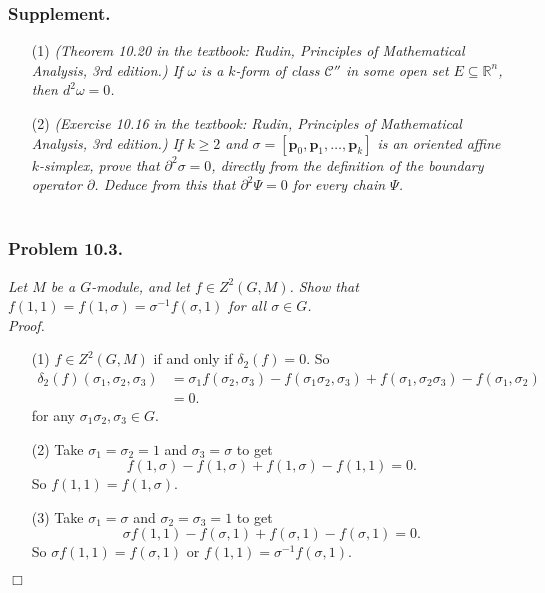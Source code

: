 \documentclass{article}
\begin{document}
\subsubsection*{Supplement.}
\begin{enumerate}
\item[(1)]
  \emph{(Theorem 10.20 in the textbook:
  Rudin, Principles of Mathematical Analysis, 3rd edition.)
  If $\omega$ is a $k$-form of class $\mathscr{C}''$
  in some open set $E \subseteq \mathbb{R}^n$, then $d^2 \omega = 0$.}

\item[(2)]
  \emph{(Exercise 10.16 in the textbook:
  Rudin, Principles of Mathematical Analysis, 3rd edition.)
  If $k \geq 2$ and $\sigma = [\mathbf{p}_0,\mathbf{p}_1,\ldots,\mathbf{p}_k]$
  is an oriented affine $k$-simplex, prove that $\partial^2 \sigma = 0$,
  directly from the definition of the boundary operator $\partial$.
  Deduce from this that $\partial^2 \Psi = 0$ for every chain $\Psi$.} \\\\
\end{enumerate}






\subsubsection*{Problem 10.3.}
\emph{Let $M$ be a $G$-module, and let $f \in Z^2(G,M)$.
Show that $f(1,1) = f(1,\sigma) = \sigma^{-1} f(\sigma, 1)$ for all $\sigma \in G$.} \\



\emph{Proof.}
\begin{enumerate}
\item[(1)]
  $f \in Z^2(G,M)$ if and only if $\delta_2(f) = 0$.
  So
  \begin{align*}
    \delta_2(f)(\sigma_1, \sigma_2, \sigma_3)
    &= \sigma_1 f(\sigma_2, \sigma_3)
        - f(\sigma_1\sigma_2,\sigma_3)
        + f(\sigma_1, \sigma_2\sigma_3)
        - f(\sigma_1, \sigma_2) \\
    &= 0.
  \end{align*}
  for any $\sigma_1 \sigma_2, \sigma_3 \in G$.

\item[(2)]
  Take $\sigma_1 = \sigma_2 = 1$ and $\sigma_3 = \sigma$ to get
  \[
    f(1,\sigma) - f(1,\sigma) + f(1,\sigma) - f(1,1) = 0.
  \]
  So $f(1,1) = f(1,\sigma)$.

\item[(3)]
  Take $\sigma_1 = \sigma$ and $\sigma_2 = \sigma_3 = 1$ to get
  \[
    \sigma f(1,1) - f(\sigma,1) + f(\sigma,1) - f(\sigma,1) = 0.
  \]
  So $\sigma f(1,1) = f(\sigma,1)$ or $f(1,1) = \sigma^{-1}f(\sigma,1)$.
\end{enumerate}
$\Box$ \\\\
\end{document}
